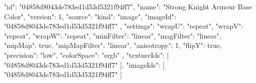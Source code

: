 {
  "id": "04858d8043de783ed1d53d5321f94ff7",
  "name": "Strong Knight Armour Base Color",
  "version": 1,
  "source": {
    "kind": "image",
    "imageId": "04858d8043de783ed1d53d5321f94ff7"
  },
  "settings": {
    "wrapU": "repeat",
    "wrapV": "repeat",
    "wrapW": "repeat",
    "minFilter": "linear",
    "magFilter": "linear",
    "mipMap": true,
    "mipMapFilter": "linear",
    "anisotropy": 1,
    "flipY": true,
    "precision": "low",
    "colorSpace": "srgb"
  },
  "textureIds": [
    "04858d8043de783ed1d53d5321f94ff7"
  ],
  "imageIds": [
    "04858d8043de783ed1d53d5321f94ff7"
  ]
}
